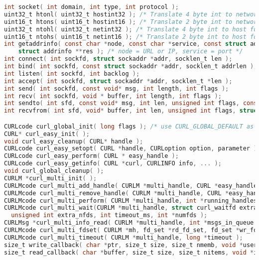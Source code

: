\documentclass[legalpaper,10pt]{article}
\begin{document}
\begin{lstlisting}[language=C]
int socket( int domain, int type, int protocol );
uint32_t htonl( uint32_t hostint32 ); /* Translate 4 byte int to network format */ 
uint16_t htons( uint16_t hostint16 ); /* Translate 2 byte int to network format */ 
uint32_t ntohl( uint32_t netint32 ); /* Translate 4 byte int to host format */ 
uint16_t ntohs( uint16_t netint16 ); /* Translate 2 byte int to host format */
int getaddrinfo( const char *node, const char *service, const struct addrinfo *hints, 
    struct addrinfo **res ); /* node = URL or IP, service = port */
int connect( int sockfd, struct sockaddr *addr, socklen_t len );
int bind( int sockfd, const struct sockaddr *addr, socklen_t addrlen );
int listen( int sockfd, int backlog );
int accept( int sockfd, struct sockaddr *addr, socklen_t *len );
int send( int sockfd, const void* msg, int length, int flags );
int recv( int sockfd, void * buffer, int length, int flags );
int sendto( int sfd, const void* msg, int len, unsigned int flags, const struct sockaddr* to, socklen_t tolength );
int recvfrom( int sfd, void* buffer, int len, unsigned int flags, struct sockaddr* from, int* fromlength );

CURLcode curl_global_init( long flags ); /* use CURL_GLOBAL_DEFAULT as flags */
CURL* curl_easy_init( );
void curl_easy_cleanup( CURL* handle );
CURLcode curl_easy_setopt( CURL *handle, CURLoption option, parameter ); /* See table below */
CURLcode curl_easy_perform( CURL * easy_handle );
CURLcode curl_easy_getinfo( CURL *curl, CURLINFO info, ... );
void curl_global_cleanup( );
CURLM *curl_multi_init( );
CURLMcode curl_multi_add_handle( CURLM *multi_handle, CURL *easy_handle );
CURLMcode curl_multi_remove_handle( CURLM *multi_handle, CURL *easy_handle );
CURLMcode curl_multi_perform( CURLM *multi_handle, int *running_handles );
CURLMcode curl_multi_wait(CURLM *multi_handle, struct curl_waitfd extra_fds[],
  unsigned int extra_nfds, int timeout_ms, int *numfds );
CURLMsg *curl_multi_info_read( CURLM *multi_handle, int *msgs_in_queue );
CURLMcode curl_multi_fdset( CURLM *mh, fd_set *rd_fd_set, fd_set *wr_fd_set, fd_set *ex_fd_set, int *max_fd );
CURLMcode curl_multi_timeout( CURLM *multi_handle, long *timeout );
size_t write_callback( char *ptr, size_t size, size_t nmemb, void *userdata );
size_t read_callback( char *buffer, size_t size, size_t nitems, void *inputdata );
\end{lstlisting}
\end{document}
